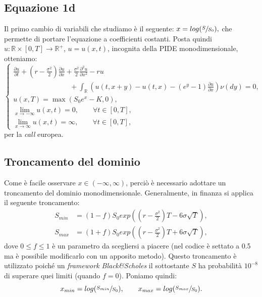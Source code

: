 \documentclass[a4paper,10pt]{report}
\newcommand{\der}[2]{\frac{\partial #1}{\partial #2}}
\newcommand{\dder}[2]{\frac{\partial^2 #1}{\partial #2^2}}
\theoremstyle{plain}
\theoremstyle{definition}
\theoremstyle{remark}
\begin{document}
\subsection{Equazione 1d}
Il primo cambio di variabili che studiamo \`e il seguente: $x=log(\sfrac{S}{S_0}),$ che permette di portare l'equazione a coefficienti costanti. Posta quindi $u: \mathbb{R}\times[0,T]\rightarrow\mathbb{R}^+$, $u=u(x,t)$, incognita della PIDE monodimensionale, otteniamo:
\begin{equation}
\label{eq:pide1dlog}
\begin{cases}
\displaystyle
\der{u}{t}+\left(r-\frac{\sigma^2}{2}\right)\der{u}{x}+\frac{\sigma^2}{2}\dder{u}{x}-ru\\
\displaystyle
\qquad\qquad\qquad\qquad+\int_\mathbb{R}\left( u(t,x+y)-u(t,x)-(e^y-1)\der{u}{x}\right)\nu(dy)=0,\\
u(x,T)=\max(S_0e^x-K,0),\\
\lim\limits_{x\to-\infty}u(x,t)=0,\qquad\forall t\in[0,T],\\
\lim\limits_{x\to\infty}u(x,t)=\infty,\qquad\forall t\in[0,T],
\end{cases}
\end{equation}
per la \emph{call} europea.
\subsection{Troncamento del dominio}
Come \`e facile osservare $x\in(-\infty,\infty)$, perci\`o \`e necessario adottare un troncamento del dominio monodimensionale. Generalmente, in finanza si applica il seguente troncamento:
\begin{align}
\label{cut}
S_{min}&=(1-f)S_0exp\left( \left(r-\frac{\sigma^2}{2}\right)T-6\sigma\sqrt{T}\right),\\
S_{max}&=(1+f)S_0exp\left( \left(r-\frac{\sigma^2}{2}\right)T+6\sigma\sqrt{T}\right), \nonumber
\end{align}
dove $0\leq f\leq1$ \`e un parametro da scegliersi a piacere (nel codice \`e settato a 0.5 ma \`e possibile modificarlo con un apposito metodo). Questo troncamento \`e utilizzato poich\'e un \emph{framework Black\&Scholes} il sottostante $S$ ha probabilit\`a $10^{-8}$ di superare quei limiti (quando $f=0$). Poniamo quindi: $$x_{min}=log(\sfrac{S_{min}}{S_0}), \qquad x_{max}=log(\sfrac{S_{max}}{S_0}).$$
\end{document}
